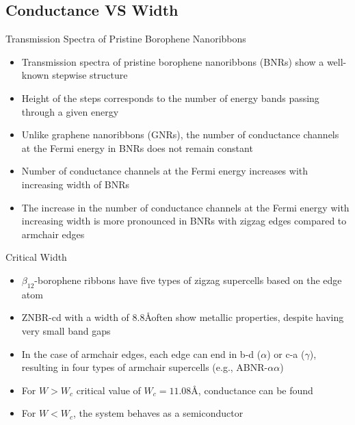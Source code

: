 \documentclass[handout,t]{beamer}
\begin{document}
\subsection{Conductance VS Width}
\begin{frame}{Transmission Spectra of Pristine Borophene Nanoribbons}
	\begin{itemize}
		\item Transmission spectra of pristine borophene nanoribbons (BNRs) show a well-known stepwise structure
		\item Height of the steps corresponds to the number of energy bands passing through a given energy
		\item Unlike graphene nanoribbons (GNRs), the number of conductance channels at the Fermi energy in BNRs does not remain constant
		\item Number of conductance channels at the Fermi energy increases with increasing width of BNRs
		\item The increase in the number of conductance channels at the Fermi energy with increasing width is more pronounced in BNRs with zigzag edges compared to armchair edges	
	\end{itemize}
\end{frame}
\begin{frame}{Critical Width}
	\begin{itemize}
		\item $\beta_{12}$-borophene ribbons have five types of zigzag supercells based on the edge atom
		\item ZNBR-cd with a width of 8.8\AA often show metallic properties, despite having very small band gaps
		\item In the case of armchair edges, each edge can end in b-d ($\alpha$) or c-a ($\gamma$), resulting in four types of armchair supercells (e.g., ABNR-$\alpha\alpha$)
		\item For $W > W_c$ critical value of $W_c = 11.08$\AA, conductance can be found
		\item For $W < W_c$, the system behaves as a semiconductor
	\end{itemize}
\end{frame}
\end{document}
